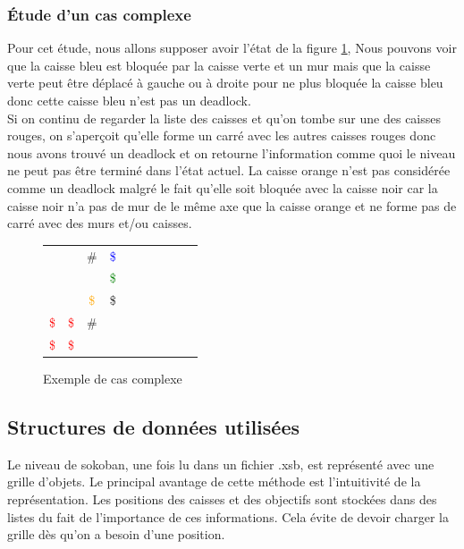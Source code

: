 \documentclass[a4paper,12pt]{article} %
\begin{document}
\subsubsection{Étude d'un cas complexe}

Pour cet étude, nous allons supposer avoir l'état de la figure \ref{DLCompl}, Nous pouvons voir que la caisse bleu est bloquée par la caisse verte et un mur mais que la caisse verte peut être déplacé à gauche ou à droite pour ne plus bloquée la caisse bleu donc cette caisse bleu n'est pas un deadlock.\\
Si on continu de regarder la liste des caisses et qu'on tombe sur une des caisses rouges, on s'aperçoit qu'elle forme un carré avec les autres caisses rouges donc nous avons trouvé un deadlock et on retourne l'information comme quoi le niveau ne peut pas être terminé dans l'état actuel. La caisse orange n'est pas considérée comme un deadlock malgré le fait qu'elle soit bloquée avec la caisse noir car la caisse noir n'a pas de mur de le même axe que la caisse orange et ne forme pas de carré avec des murs et/ou caisses.

\begin{figure}[!h]
\centering
\begin{tabular}{ l*{4} c*{5} r }
\  & \  & \# & \textcolor{blue}{\$} \\
\  & \  & \  & \textcolor{green}{\$} \\
\  & \  & \textcolor{orange}{\$} & \$ \\
\textcolor{red}{\$} & \textcolor{red}{\$} & \# & \  \\
\textcolor{red}{\$} & \textcolor{red}{\$} & \  & \  \\
\end{tabular}
\caption{Exemple de cas complexe}
\label{DLCompl}
\end{figure}

\subsection{Structures de données utilisées}

Le niveau de sokoban, une fois lu dans un fichier .xsb, est représenté avec une grille d'objets. Le principal avantage de cette méthode est l'intuitivité de la représentation.
Les positions des caisses et des objectifs sont stockées dans des listes du fait de l'importance de ces informations. Cela évite de devoir charger la grille dès qu'on a besoin d'une position.\\
\end{document}
